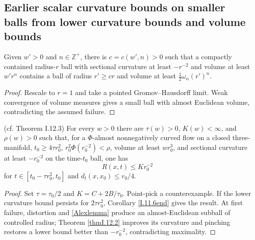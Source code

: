\subsection{Earlier scalar curvature bounds on smaller balls from lower curvature bounds and volume bounds}
\label{I.12.3}
\begin{lemma}
\label{lem:kl-earlier-scalar-curvature-bounds-smaller-balls-from-lower-curvature-bound-existence-scalar-curvature}

\label{Alexlemma}
Given $w'>0$ and $n\in\mathbb Z^+$, there is $c=c(w',n)>0$ such that a
compactly contained radius-$r$ ball with sectional curvature at least
$-r^{-2}$ and volume at least $w'r^n$ contains a ball of radius
$r'\geq cr$ and volume at least $\frac12\omega_n(r')^n$.
\end{lemma}
\begin{proof}
\sketch Rescale to $r=1$ and take a pointed Gromov--Hausdorff limit.
Weak convergence of volume measures gives a small ball with almost Euclidean
volume, contradicting the assumed failure.
\end{proof}
\begin{theorem}
\label{thm:kl-earlier-scalar-curvature-bounds-smaller-balls-from-lower-curvature-bound-estimates-scalar-curvature}

(cf. Theorem I.12.3) \label{thmI.12.3}
For every $w>0$ there are $\tau(w)>0$, $K(w)<\infty$, and $\rho(w)>0$ such
that, for a $\Phi$-almost nonnegatively curved flow on a closed
three-manifold, $t_0\geq4\tau r_0^2$,
$r_0^2\Phi(r_0^{-2})<\rho$, volume at least $wr_0^3$, and sectional
curvature at least $-r_0^{-2}$ on the time-$t_0$ ball, one has
\[
R(x,t)\leq Kr_0^{-2}
\]
for $t\in[t_0-\tau r_0^2,t_0]$ and $d_t(x,x_0)\leq r_0/4$.
\end{theorem}
\begin{proof}
\sketch Set $\tau=\tau_0/2$ and $K=C+2B/\tau_0$.  Point-pick a
counterexample.  If the lower curvature bound persists for $2\tau r_0^2$,
Corollary \ref{I.11.6end} gives the result.  At first failure, distortion and
\ref{Alexlemma} produce an almost-Euclidean subball of controlled radius;
Theorem \ref{thmI.12.2} improves its curvature and pinching restores a lower
bound better than $-r_0^{-2}$, contradicting maximality.
\end{proof}

